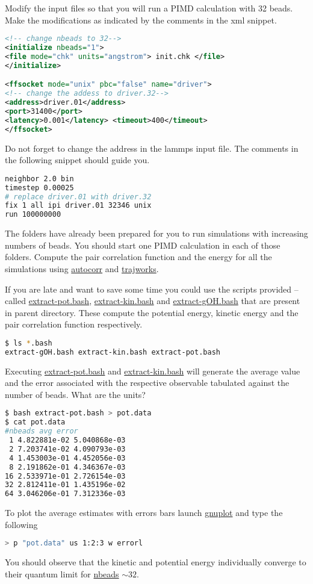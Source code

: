 \documentclass{article}
\begin{document}
\begin{Exercise}[label={water},title={Benchmark of quantum effects in a water molecule}]
\Question
Modify the input files so that you will run a PIMD calculation with 32 beads.
Make the modifications as indicated by the comments in the xml snippet.
\begin{lstlisting}[language=xml]
<!-- change nbeads to 32--> 
<initialize nbeads="1">  
<file mode="chk" units="angstrom"> init.chk </file>
</initialize>

<ffsocket mode="unix" pbc="false" name="driver">
<!-- change the addess to driver.32--> 
<address>driver.01</address>
<port>31400</port>
<latency>0.001</latency> <timeout>400</timeout>
</ffsocket>
\end{lstlisting}

\Question
Do not forget to change the address in the lammps input file. 
The comments in the following snippet should guide you.
\begin{lstlisting}[language=sh]
neighbor 2.0 bin
timestep 0.00025
# replace driver.01 with driver.32
fix 1 all ipi driver.01 32346 unix
run 100000000
\end{lstlisting}

\Question
The folders  have already been prepared for you to run simulations with 
increasing numbers of beads. You should start one PIMD calculation in each of those folders.
Compute the pair correlation function and the energy for all the simulations using \url{autocorr} and \url{trajworks}.


\Question
If you are late and want to save some time you could use the scripts provided -- 
called \url{extract-pot.bash}, \url{extract-kin.bash} and \url{extract-gOH.bash} 
that are present in parent directory. These compute the potential energy, 
kinetic energy and the pair correlation function respectively. 
\begin{lstlisting}[language=bash]
$ ls *.bash  
extract-gOH.bash extract-kin.bash extract-pot.bash
\end{lstlisting}


\Question
Executing \url{extract-pot.bash} and \url{extract-kin.bash} will generate the average value and the error associated with the respective observable tabulated against the number of beads. What are the units? 
\begin{lstlisting}[language=bash]
$ bash extract-pot.bash > pot.data
$ cat pot.data
#nbeads avg error
 1 4.822881e-02 5.040868e-03
 2 7.203741e-02 4.090793e-03
 4 1.453003e-01 4.452056e-03
 8 2.191862e-01 4.346367e-03
16 2.533971e-01 2.726154e-03
32 2.812411e-01 1.435196e-02
64 3.046206e-01 7.312336e-03
\end{lstlisting}
To plot the average estimates with errors bars launch \url{gnuplot} and type the following
\begin{lstlisting}[language=bash]
> p "pot.data" us 1:2:3 w errorl
\end{lstlisting}
You should observe that the kinetic and potential energy individually converge to their quantum limit for \url{nbeads} $\sim 32$.


\end{Exercise}
\end{document}
